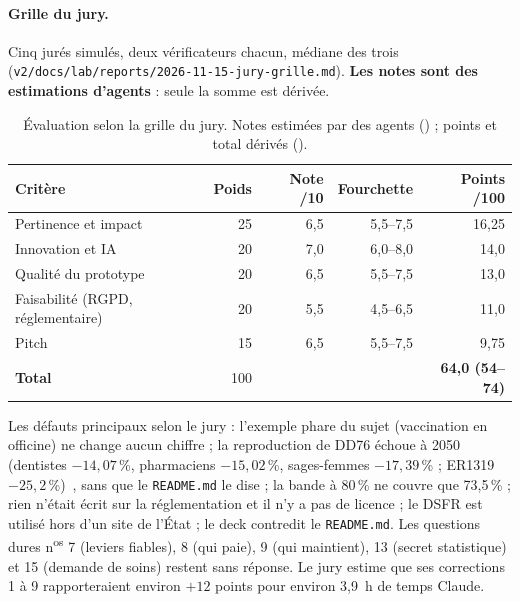 \paragraph{Grille du jury.}
Cinq jurés simulés, deux vérificateurs chacun, médiane des trois (\texttt{v2/\allowbreak{}docs/\allowbreak{}lab/\allowbreak{}reports/\allowbreak{}2026-\allowbreak{}11-\allowbreak{}15-\allowbreak{}jury-\allowbreak{}grille.md}).
\textbf{Les notes sont des estimations d'agents} : seule la somme est dérivée.

\begin{table}[htbp]\centering\small
\caption{Évaluation selon la grille du jury. Notes estimées par des agents (\suppose{}) ; points et total dérivés (\derive{}).}\label{pro:tab-jury}
\begin{tabular}{@{}lrrrr@{}}
\toprule Critère & Poids & Note /10 & Fourchette & Points /100 \\ \midrule
Pertinence et impact & 25 & 6,5\suppose{} & 5,5--7,5\suppose{} & 16,25\derive{} \\
Innovation et IA & 20 & 7,0\suppose{} & 6,0--8,0\suppose{} & 14,0\derive{} \\
Qualité du prototype & 20 & 6,5\suppose{} & 5,5--7,5\suppose{} & 13,0\derive{} \\
Faisabilité (RGPD, réglementaire) & 20 & 5,5\suppose{} & 4,5--6,5\suppose{} & 11,0\derive{} \\
Pitch & 15 & 6,5\suppose{} & 5,5--7,5\suppose{} & 9,75\derive{} \\ \midrule
\textbf{Total} & 100 & & & \textbf{64,0\derive{} (54--74\derive{})} \\ \bottomrule
\end{tabular}
\end{table}

Les défauts principaux selon le jury : l'exemple phare du sujet (vaccination en officine) ne change aucun chiffre ; la reproduction de DD76 échoue à 2050 (dentistes $-14{,}07$\mesure{}\,\%, pharmaciens $-15{,}02$\mesure{}\,\%, sages-femmes $-17{,}39$\mesure{}\,\% ; ER1319 $-25{,}2$\mesure{}\,\%)~\citep{e-dd76,e-er1319}, sans que le \texttt{README.md} le dise ; la bande à 80\,\% ne couvre que 73,5\mesure{}\,\% ; rien n'était écrit sur la réglementation et il n'y a pas de licence ; le DSFR est utilisé hors d'un site de l'État ; le deck contredit le \texttt{README.md}.
Les questions dures n\textsuperscript{os} 7 (leviers fiables), 8 (qui paie), 9 (qui maintient), 13 (secret statistique) et 15 (demande de soins) restent sans réponse.
Le jury estime que ses corrections 1 à 9 rapporteraient environ $+12$\suppose{} points pour environ 3,9\suppose{}~h de temps Claude.

